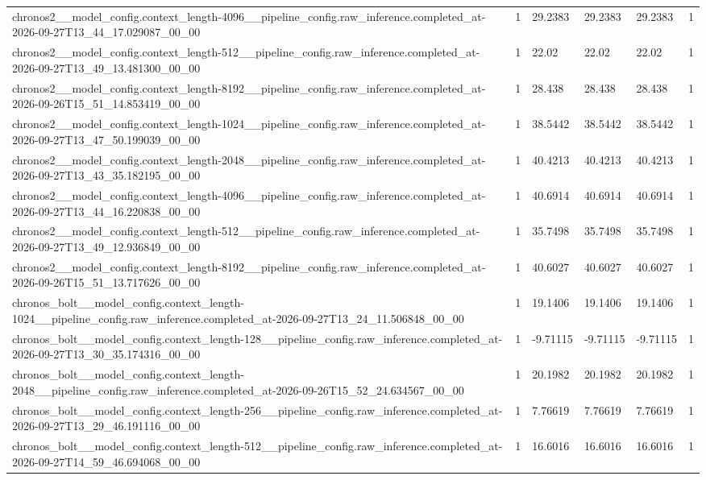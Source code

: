 \begin{tabular}{llllll}
chronos2\_\_model\_config.context\_length-4096\_\_pipeline\_config.raw\_inference.completed\_at-2026-09-27T13\_44\_17.029087\_00\_00 & 1 & 29.2383 & 29.2383 & 29.2383 & 1 \\
chronos2\_\_model\_config.context\_length-512\_\_pipeline\_config.raw\_inference.completed\_at-2026-09-27T13\_49\_13.481300\_00\_00 & 1 & 22.02 & 22.02 & 22.02 & 1 \\
chronos2\_\_model\_config.context\_length-8192\_\_pipeline\_config.raw\_inference.completed\_at-2026-09-26T15\_51\_14.853419\_00\_00 & 1 & 28.438 & 28.438 & 28.438 & 1 \\
chronos2\_\_model\_config.context\_length-1024\_\_pipeline\_config.raw\_inference.completed\_at-2026-09-27T13\_47\_50.199039\_00\_00 & 1 & 38.5442 & 38.5442 & 38.5442 & 1 \\
chronos2\_\_model\_config.context\_length-2048\_\_pipeline\_config.raw\_inference.completed\_at-2026-09-27T13\_43\_35.182195\_00\_00 & 1 & 40.4213 & 40.4213 & 40.4213 & 1 \\
chronos2\_\_model\_config.context\_length-4096\_\_pipeline\_config.raw\_inference.completed\_at-2026-09-27T13\_44\_16.220838\_00\_00 & 1 & 40.6914 & 40.6914 & 40.6914 & 1 \\
chronos2\_\_model\_config.context\_length-512\_\_pipeline\_config.raw\_inference.completed\_at-2026-09-27T13\_49\_12.936849\_00\_00 & 1 & 35.7498 & 35.7498 & 35.7498 & 1 \\
chronos2\_\_model\_config.context\_length-8192\_\_pipeline\_config.raw\_inference.completed\_at-2026-09-26T15\_51\_13.717626\_00\_00 & 1 & 40.6027 & 40.6027 & 40.6027 & 1 \\
chronos\_bolt\_\_model\_config.context\_length-1024\_\_pipeline\_config.raw\_inference.completed\_at-2026-09-27T13\_24\_11.506848\_00\_00 & 1 & 19.1406 & 19.1406 & 19.1406 & 1 \\
chronos\_bolt\_\_model\_config.context\_length-128\_\_pipeline\_config.raw\_inference.completed\_at-2026-09-27T13\_30\_35.174316\_00\_00 & 1 & -9.71115 & -9.71115 & -9.71115 & 1 \\
chronos\_bolt\_\_model\_config.context\_length-2048\_\_pipeline\_config.raw\_inference.completed\_at-2026-09-26T15\_52\_24.634567\_00\_00 & 1 & 20.1982 & 20.1982 & 20.1982 & 1 \\
chronos\_bolt\_\_model\_config.context\_length-256\_\_pipeline\_config.raw\_inference.completed\_at-2026-09-27T13\_29\_46.191116\_00\_00 & 1 & 7.76619 & 7.76619 & 7.76619 & 1 \\
chronos\_bolt\_\_model\_config.context\_length-512\_\_pipeline\_config.raw\_inference.completed\_at-2026-09-27T14\_59\_46.694068\_00\_00 & 1 & 16.6016 & 16.6016 & 16.6016 & 1 \\

\end{tabular}
